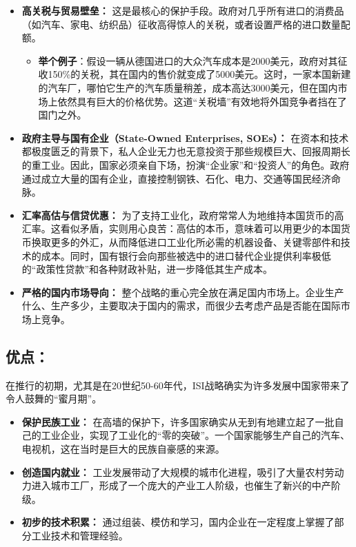 \begin{itemize}
    \item \textbf{高关税与贸易壁垒：} 这是最核心的保护手段。政府对几乎所有进口的消费品（如汽车、家电、纺织品）征收高得惊人的关税，或者设置严格的进口数量配额。
    \begin{itemize}
        \item \textbf{举个例子}：假设一辆从德国进口的大众汽车成本是2000美元，政府对其征收150\%的关税，其在国内的售价就变成了5000美元。这时，一家本国新建的汽车厂，哪怕它生产的汽车质量稍差，成本高达3000美元，但在国内市场上依然具有巨大的价格优势。这道“关税墙”有效地将外国竞争者挡在了国门之外。
    \end{itemize}
    \item \textbf{政府主导与国有企业（State-Owned Enterprises, SOEs）：} 在资本和技术都极度匮乏的背景下，私人企业无力也无意投资于那些规模巨大、回报周期长的重工业。因此，国家必须亲自下场，扮演“企业家”和“投资人”的角色。政府通过成立大量的国有企业，直接控制钢铁、石化、电力、交通等国民经济命脉。
    \item \textbf{汇率高估与信贷优惠：} 为了支持工业化，政府常常人为地维持本国货币的高汇率。这看似矛盾，实则用心良苦：高估的本币，意味着可以用更少的本国货币换取更多的外汇，从而降低进口工业化所必需的机器设备、关键零部件和技术的成本。同时，国有银行会向那些被选中的进口替代企业提供利率极低的“政策性贷款”和各种财政补贴，进一步降低其生产成本。
    \item \textbf{严格的国内市场导向：} 整个战略的重心完全放在满足国内市场上。企业生产什么、生产多少，主要取决于国内的需求，而很少去考虑产品是否能在国际市场上竞争。
\end{itemize}

\subsection{优点：}

在推行的初期，尤其是在20世纪50-60年代，ISI战略确实为许多发展中国家带来了令人鼓舞的“蜜月期”。

\begin{itemize}
    \item \textbf{保护民族工业：} 在高墙的保护下，许多国家确实从无到有地建立起了一批自己的工业企业，实现了工业化的“零的突破”。一个国家能够生产自己的汽车、电视机，这在当时是巨大的民族自豪感的来源。
    \item \textbf{创造国内就业：} 工业发展带动了大规模的城市化进程，吸引了大量农村劳动力进入城市工厂，形成了一个庞大的产业工人阶级，也催生了新兴的中产阶级。
    \item \textbf{初步的技术积累：} 通过组装、模仿和学习，国内企业在一定程度上掌握了部分工业技术和管理经验。
\end{itemize}

